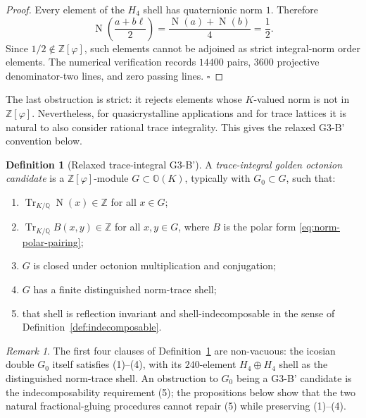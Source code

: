 \documentclass[12pt,oneside,english]{amsart}
\numberwithin{equation}{section}
\numberwithin{figure}{section}
\numberwithin{table}{section}
\theoremstyle{plain}
\theoremstyle{definition}
\newtheorem{definition}[theorem]{Definition}
\theoremstyle{remark}
\newtheorem{remark}[theorem]{Remark}
\newcommand{\ZZ}{\mathbb Z}
\newcommand{\QQ}{\mathbb Q}
\newcommand{\Oct}{\mathbb O}
\newcommand{\Zphi}{\mathbb Z[\varphi]}
\newcommand{\Tr}{\operatorname{Tr}}
\newcommand{\Norm}{\operatorname{N}}
\begin{document}
\begin{proof}
Every element of the \(H_4\) shell has quaternionic norm \(1\). Therefore
\begin{equation}
\Norm\left(\frac{a+b\ell}{2}\right)=\frac{\Norm(a)+\Norm(b)}{4}
=\frac12.
\label{eq:mixed-half-root-norm}
\end{equation}
Since \(1/2\notin\Zphi\), such elements cannot be adjoined as strict integral-norm order elements. The numerical verification records \(14400\) pairs, \(3600\) projective denominator-two lines, and zero passing lines. \(\square\)
\end{proof}

The last obstruction is strict: it rejects elements whose \(K\)-valued norm is not in \(\Zphi\). Nevertheless, for quasicrystalline applications and for trace lattices it is natural to also consider rational trace integrality. This gives the relaxed G3-B' convention below.

\begin{definition}[Relaxed trace-integral G3-B']
\label{def:g3b}
A \emph{trace-integral golden octonion candidate} is a \(\Zphi\)-module \(G\subset\Oct(K)\), typically with \(G_0\subset G\), such that:
\begin{enumerate}
\item \(\Tr_{K/\QQ}\Norm(x)\in\ZZ\) for all \(x\in G\);
\item \(\Tr_{K/\QQ}B(x,y)\in\ZZ\) for all \(x,y\in G\), where \(B\) is the polar form \eqref{eq:norm-polar-pairing};
\item \(G\) is closed under octonion multiplication and conjugation;
\item \(G\) has a finite distinguished norm-trace shell;
\item that shell is reflection invariant and shell-indecomposable in the sense of Definition~\ref{def:indecomposable}.
\end{enumerate}
\end{definition}

\begin{remark}
\label{rem:g3b-nonvacuous}
The first four clauses of Definition~\ref{def:g3b} are non-vacuous: the icosian double \(G_0\) itself satisfies (1)--(4), with its \(240\)-element \(H_4\oplus H_4\) shell as the distinguished norm-trace shell. An obstruction to \(G_0\) being a G3-B' candidate is the indecomposability requirement (5); the propositions below show that the two natural fractional-gluing procedures cannot repair (5) while preserving (1)--(4).
\end{remark}
\end{document}
